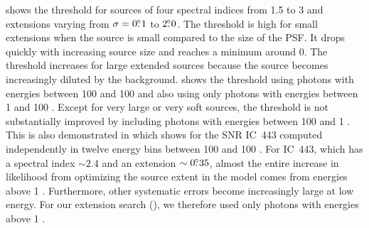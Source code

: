  shows the threshold for sources of four
spectral indices from 1.5 to 3 and extensions varying from $\sigma=0\mbox{$.\!\!^\circ$}1$
to $2\mbox{$.\!\!^\circ$}0$.  
The threshold is high for small extensions when the
source is 
small compared to the size of the PSF. 
It drops quickly with increasing source size and reaches
a minimum around 0. 
The threshold increases
for large extended sources because the source becomes
increasingly diluted by the background.
 shows
the threshold using photons with energies between 100 \mev and 100 \gev
and also using only photons with energies between 1 \gev and 100 \gev.
Except for very large or very soft
sources, the threshold is
not substantially improved by including photons with energies between 100 \mev and
1 \gev.  This is also demonstrated in 
which shows \tsext for the SNR IC~443 computed independently in twelve
energy bins between 100 \mev and 100 \gev. For IC~443, which has a
spectral index $\sim2.4$ and an extension $\sim0\mbox{$.\!\!^\circ$}35$, 
almost the entire 
increase in likelihood from optimizing the source extent in the model
comes
from energies above 1 \gev.  Furthermore, other systematic errors
become increasingly large at low energy. For our extension search
(),
we therefore used only photons with energies above 1 \gev.



